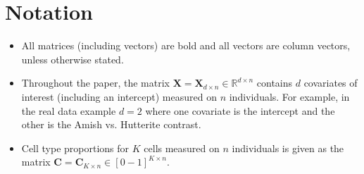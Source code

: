 \documentclass{article}
\begin{document}
\section{Notation}
\begin{itemize}
\item All matrices (including vectors) are bold and all vectors are column vectors, unless otherwise stated.
\item Throughout the paper, the matrix $\bm{X} = \bm{X}_{d \times n} \in \mathbb{R}^{d \times n}$ contains $d$ covariates of interest (including an intercept) measured on $n$ individuals. For example, in the real data example $d = 2$ where one covariate is the intercept and the other is the Amish vs. Hutterite contrast.
\item Cell type proportions for $K$ cells measured on $n$ individuals is given as the matrix $\bm{C} = \bm{C}_{K \times n} \in [0-1]^{K \times n}$. 
\end{itemize}
\end{document}
